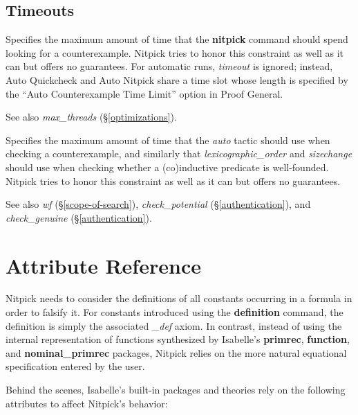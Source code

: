 \documentclass[a4paper,12pt]{article}
\begin{document}
\subsection{Timeouts}
\label{timeouts}

\begin{enum}
Specifies the maximum amount of time that the \textbf{nitpick} command should
spend looking for a counterexample. Nitpick tries to honor this constraint as
well as it can but offers no guarantees. For automatic runs,
\textit{timeout} is ignored; instead, Auto Quickcheck and Auto Nitpick share
a time slot whose length is specified by the ``Auto Counterexample Time
Limit'' option in Proof General.

\nopagebreak
{\small See also \textit{max\_threads} (\S\ref{optimizations}).}

Specifies the maximum amount of time that the \textit{auto} tactic should use
when checking a counterexample, and similarly that \textit{lexicographic\_order}
and \textit{sizechange} should use when checking whether a (co)in\-duc\-tive
predicate is well-founded. Nitpick tries to honor this constraint as well as it
can but offers no guarantees.

\nopagebreak
{\small See also \textit{wf} (\S\ref{scope-of-search}),
\textit{check\_potential} (\S\ref{authentication}),
and \textit{check\_genuine} (\S\ref{authentication}).}
\end{enum}

\section{Attribute Reference}
\label{attribute-reference}

Nitpick needs to consider the definitions of all constants occurring in a
formula in order to falsify it. For constants introduced using the
\textbf{definition} command, the definition is simply the associated
\textit{\_def} axiom. In contrast, instead of using the internal representation
of functions synthesized by Isabelle's \textbf{primrec}, \textbf{function}, and
\textbf{nominal\_primrec} packages, Nitpick relies on the more natural
equational specification entered by the user.

Behind the scenes, Isabelle's built-in packages and theories rely on the
following attributes to affect Nitpick's behavior:
\end{document}
